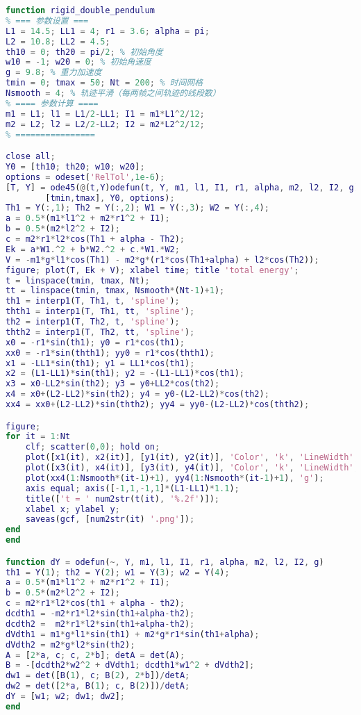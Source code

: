 \begin{lstlisting}[language=matlab, caption=rigid\_double\_pendulum.m]
% 刚体双摆
function rigid_double_pendulum
% === 参数设置 ===
L1 = 14.5; LL1 = 4; r1 = 3.6; alpha = pi;
L2 = 10.8; LL2 = 4.5;
th10 = 0; th20 = pi/2; % 初始角度
w10 = -1; w20 = 0; % 初始角速度
g = 9.8; % 重力加速度
tmin = 0; tmax = 50; Nt = 200; % 时间网格
Nsmooth = 4; % 轨迹平滑（每两帧之间轨迹的线段数）
% ==== 参数计算 ====
m1 = L1; l1 = L1/2-LL1; I1 = m1*L1^2/12;
m2 = L2; l2 = L2/2-LL2; I2 = m2*L2^2/12;
% ================

close all;
Y0 = [th10; th20; w10; w20];
options = odeset('RelTol',1e-6);
[T, Y] = ode45(@(t,Y)odefun(t, Y, m1, l1, I1, r1, alpha, m2, l2, I2, g), ...
        [tmin,tmax], Y0, options);
Th1 = Y(:,1); Th2 = Y(:,2); W1 = Y(:,3); W2 = Y(:,4);
a = 0.5*(m1*l1^2 + m2*r1^2 + I1);
b = 0.5*(m2*l2^2 + I2);
c = m2*r1*l2*cos(Th1 + alpha - Th2);
Ek = a*W1.^2 + b*W2.^2 + c.*W1.*W2;
V = -m1*g*l1*cos(Th1) - m2*g*(r1*cos(Th1+alpha) + l2*cos(Th2));
figure; plot(T, Ek + V); xlabel time; title 'total energy';
t = linspace(tmin, tmax, Nt);
tt = linspace(tmin, tmax, Nsmooth*(Nt-1)+1);
th1 = interp1(T, Th1, t, 'spline');
thth1 = interp1(T, Th1, tt, 'spline');
th2 = interp1(T, Th2, t, 'spline');
thth2 = interp1(T, Th2, tt, 'spline');
x0 = -r1*sin(th1); y0 = r1*cos(th1);
xx0 = -r1*sin(thth1); yy0 = r1*cos(thth1);
x1 = -LL1*sin(th1); y1 = LL1*cos(th1);
x2 = (L1-LL1)*sin(th1); y2 = -(L1-LL1)*cos(th1);
x3 = x0-LL2*sin(th2); y3 = y0+LL2*cos(th2);
x4 = x0+(L2-LL2)*sin(th2); y4 = y0-(L2-LL2)*cos(th2);
xx4 = xx0+(L2-LL2)*sin(thth2); yy4 = yy0-(L2-LL2)*cos(thth2);

figure;
for it = 1:Nt
    clf; scatter(0,0); hold on;
    plot([x1(it), x2(it)], [y1(it), y2(it)], 'Color', 'k', 'LineWidth', 2);
    plot([x3(it), x4(it)], [y3(it), y4(it)], 'Color', 'k', 'LineWidth', 2);
    plot(xx4(1:Nsmooth*(it-1)+1), yy4(1:Nsmooth*(it-1)+1), 'g');
    axis equal; axis([-1,1,-1,1]*(L1-LL1)*1.1);
    title(['t = ' num2str(t(it), '%.2f')]);
    xlabel x; ylabel y;
    saveas(gcf, [num2str(it) '.png']);
end
end

function dY = odefun(~, Y, m1, l1, I1, r1, alpha, m2, l2, I2, g)
th1 = Y(1); th2 = Y(2); w1 = Y(3); w2 = Y(4);
a = 0.5*(m1*l1^2 + m2*r1^2 + I1);
b = 0.5*(m2*l2^2 + I2);
c = m2*r1*l2*cos(th1 + alpha - th2);
dcdth1 = -m2*r1*l2*sin(th1+alpha-th2);
dcdth2 =  m2*r1*l2*sin(th1+alpha-th2);
dVdth1 = m1*g*l1*sin(th1) + m2*g*r1*sin(th1+alpha);
dVdth2 = m2*g*l2*sin(th2);
A = [2*a, c; c, 2*b]; detA = det(A);
B = -[dcdth2*w2^2 + dVdth1; dcdth1*w1^2 + dVdth2];
dw1 = det([B(1), c; B(2), 2*b])/detA;
dw2 = det([2*a, B(1); c, B(2)])/detA;
dY = [w1; w2; dw1; dw2];
end
\end{lstlisting}
